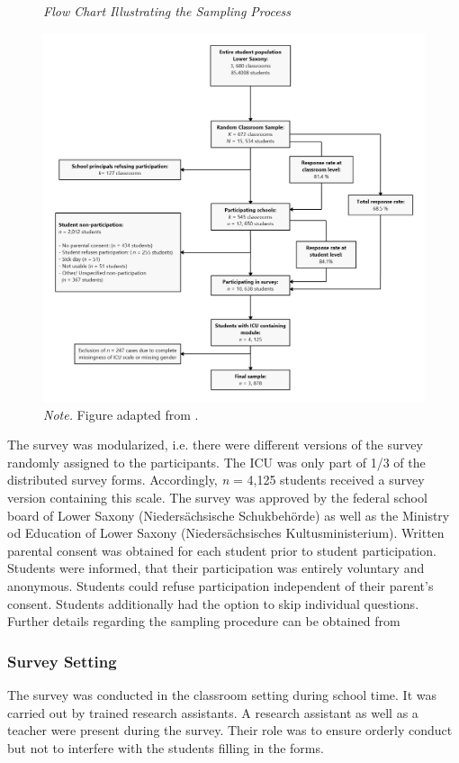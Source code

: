 \documentclass[a4paper,12pt]{article} %
\begin{document}
\begin{figure}[h!]
	\caption{\label{fig:flowchart}\protect\linebreak[1]\textit{Flow Chart Illustrating  the Sampling Process}}
		\centering
	\includegraphics[width=\textwidth]{../figures/flowchart.png}
	\caption*{\textit{Note.} Figure adapted from \parencite{kliem_factor_2019}.}
\end{figure}

The survey was modularized, i.e. there were different versions of the survey randomly assigned to the participants.
The ICU was only part of 1/3 of the distributed survey forms.
Accordingly, \textit{n} = 4,125 students received a survey version containing this scale.
The survey was approved by the federal school board of Lower Saxony (Nieders\"achsische Schukbeh\"orde) as well as the Ministry od Education of Lower Saxony (Nieders\"achsisches Kultusministerium).
Written parental consent was obtained for each student prior to student participation.
Students were informed, that their participation was entirely voluntary and anonymous.
Students could refuse participation independent of their parent's consent.
Students additionally had the option to skip individual questions.
Further details regarding the sampling procedure can be obtained from \parencite{bergmann_jugendliche_2017}

\subsubsection{Survey Setting}
The survey was conducted in the classroom setting during school time.
It was carried out by trained research assistants.
A research assistant as well as a teacher were present during the survey.
Their role was to ensure orderly conduct but not to interfere with the students filling in the forms.
\end{document}
